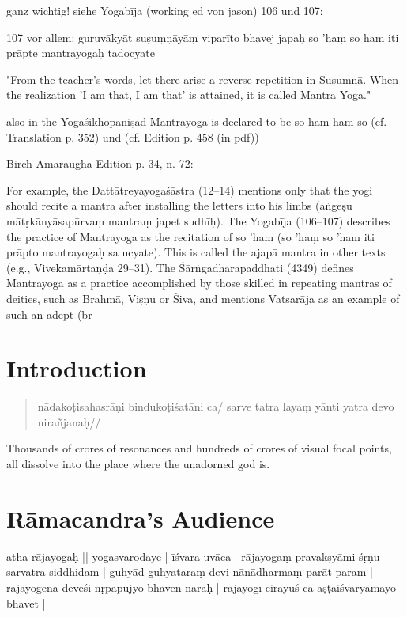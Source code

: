 {ganz wichtig! siehe Yogabīja (working ed von jason) 106 und 107:

107 vor allem: guruvākyāt suṣuṃṇāyāṃ viparīto bhavej japaḥ
so 'haṃ so ham iti prāpte mantrayogaḥ tadocyate

"From the teacher's words, let there arise a reverse repetition in Suṣumnā. When the realization 'I am that, I am that' is attained, it is called Mantra Yoga."


also in the Yogaśikhopaniṣad Mantrayoga is declared to be so ham ham so (cf. Translation p. 352) und (cf. Edition p. 458 (in pdf)) 


Birch Amaraugha-Edition
p. 34, n. 72:

For example, the Dattātreyayogaśāstra (12–14) mentions only that the yogi should recite
a mantra after installing the letters into his limbs (aṅgeṣu mātṛkānyāsapūrvaṃ mantraṃ japet
sudhīḥ). The Yogabīja (106–107) describes the practice of Mantrayoga as the recitation of so
’ham (so ’haṃ so ’ham iti prāpto mantrayogaḥ sa ucyate). This is called the ajapā mantra in other
texts (e.g., Vivekamārtaṇḍa 29–31). The Śārṅgadharapaddhati (4349) defines Mantrayoga as
a practice accomplished by those skilled in repeating mantras of deities, such as Brahmā,
Viṣṇu or Śiva, and mentions Vatsarāja as an example of such an adept (br

\chapter{Introduction}
\mainmatter

\begin{quote}
nādakoṭisahasrāṇi bindukoṭiśatāni ca/
sarve tatra layaṃ yānti yatra devo nirañjanaḥ//
\end{quote}

Thousands of crores of resonances and hundreds of crores of visual focal points, all dissolve into the place where the unadorned god is.


\chapter{Rāmacandra's Audience}

atha rājayogaḥ || yogasvarodaye | īśvara uvāca |
rājayogaṃ pravakṣyāmi śṛṇu sarvatra siddhidam |
guhyād guhyataraṃ devi nānādharmaṃ parāt param |
rājayogena deveśi nṛpapūjyo bhaven naraḥ |
rājayogī cirāyuś ca aṣṭaiśvaryamayo bhavet ||

}
